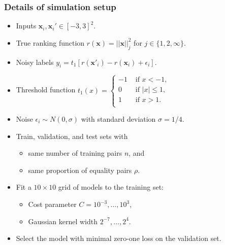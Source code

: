 \documentclass{beamer}
\begin{document}
\begin{frame}
  \frametitle{Details of simulation setup}
  \begin{itemize}
    \item Inputs $\mathbf x_i,\mathbf x_i'\in[-3,3]^2$.
    \item True ranking function $r(\mathbf x)=||\mathbf x||^2_j$ 
      for $j\in\{1,2,\infty\}$.
    \item Noisy labels $y_i=t_1[r(\mathbf x'_i)-r(\mathbf x_i)+\epsilon_i]$.
  \item Threshold function
$
  \label{eq:threshold}
  t_1(x) = 
  \begin{cases}
    -1 & \text{ if } x < -1, \\
    0 & \text{ if } |x| \leq 1, \\
    1 & \text{ if } x > 1. \\
  \end{cases}
$
\item Noise $\epsilon_i\sim N(0, \sigma)$ with standard deviation
  $\sigma=1/4$.
\item Train, validation, and test sets with
  \begin{itemize}
    \item same number of training pairs $n$, and
    \item same proportion of equality pairs $\rho$.
  \end{itemize}
\item Fit a $10\times 10$ grid of models to the training
set:
\begin{itemize}
\item Cost parameter $C=10^{-3},\dots,10^3$,
\item Gaussian kernel width $2^{-7},\dots,2^4$.
\end{itemize}
\item Select the model with minimal zero-one loss on the validation set.
  \end{itemize}
\end{frame}
\end{document}
